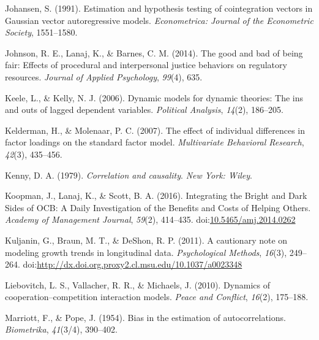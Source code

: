 \documentclass[english,,man]{apa6}
\theoremstyle{definition}
\theoremstyle{definition}
\theoremstyle{definition}
\theoremstyle{remark}
\begin{document}
\leavevmode\hypertarget{ref-johansen_estimation_1991}{}%
Johansen, S. (1991). Estimation and hypothesis testing of cointegration
vectors in Gaussian vector autoregressive models. \emph{Econometrica:
Journal of the Econometric Society}, 1551--1580.

\leavevmode\hypertarget{ref-johnson_good_2014}{}%
Johnson, R. E., Lanaj, K., \& Barnes, C. M. (2014). The good and bad of
being fair: Effects of procedural and interpersonal justice behaviors on
regulatory resources. \emph{Journal of Applied Psychology},
\emph{99}(4), 635.

\leavevmode\hypertarget{ref-keele_dynamic_2006}{}%
Keele, L., \& Kelly, N. J. (2006). Dynamic models for dynamic theories:
The ins and outs of lagged dependent variables. \emph{Political
Analysis}, \emph{14}(2), 186--205.

\leavevmode\hypertarget{ref-kelderman2007effect}{}%
Kelderman, H., \& Molenaar, P. C. (2007). The effect of individual
differences in factor loadings on the standard factor model.
\emph{Multivariate Behavioral Research}, \emph{42}(3), 435--456.

\leavevmode\hypertarget{ref-kenny1979correlation}{}%
Kenny, D. A. (1979). \emph{Correlation and causality}. \emph{New York:
Wiley}.

\leavevmode\hypertarget{ref-koopman_integrating_2016}{}%
Koopman, J., Lanaj, K., \& Scott, B. A. (2016). Integrating the Bright
and Dark Sides of OCB: A Daily Investigation of the Benefits and Costs
of Helping Others. \emph{Academy of Management Journal}, \emph{59}(2),
414--435.
doi:\href{https://doi.org/10.5465/amj.2014.0262}{10.5465/amj.2014.0262}

\leavevmode\hypertarget{ref-kuljanin_cautionary_2011}{}%
Kuljanin, G., Braun, M. T., \& DeShon, R. P. (2011). A cautionary note
on modeling growth trends in longitudinal data. \emph{Psychological
Methods}, \emph{16}(3), 249--264.
doi:\href{https://doi.org/http://dx.doi.org.proxy2.cl.msu.edu/10.1037/a0023348}{http://dx.doi.org.proxy2.cl.msu.edu/10.1037/a0023348}

\leavevmode\hypertarget{ref-liebovitch2010dynamics}{}%
Liebovitch, L. S., Vallacher, R. R., \& Michaels, J. (2010). Dynamics of
cooperation--competition interaction models. \emph{Peace and Conflict},
\emph{16}(2), 175--188.

\leavevmode\hypertarget{ref-marriott1954bias}{}%
Marriott, F., \& Pope, J. (1954). Bias in the estimation of
autocorrelations. \emph{Biometrika}, \emph{41}(3/4), 390--402.
\end{document}
